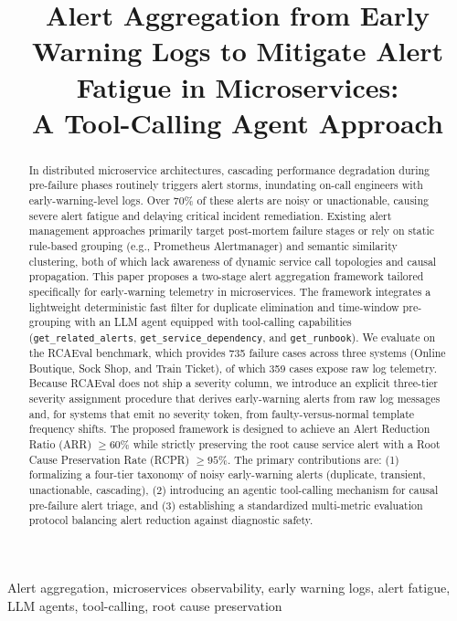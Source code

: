 \documentclass[conference]{IEEEtran}
\title{Alert Aggregation from Early Warning Logs to Mitigate Alert Fatigue in Microservices:\\A Tool-Calling Agent Approach}
\author{
\IEEEauthorblockN{Dang Quang Hien}
\IEEEauthorblockA{
Faculty of Information Technology\\
University of Science, VNU-HCM\\
Ho Chi Minh City, Vietnam\\
dqhien@fit.hcmus.edu.vn
}
}
\begin{document}
\maketitle

\begin{abstract}
In distributed microservice architectures, cascading performance degradation during pre-failure phases routinely triggers alert storms, inundating on-call engineers with early-warning-level logs. Over 70\% of these alerts are noisy or unactionable, causing severe alert fatigue and delaying critical incident remediation. Existing alert management approaches primarily target post-mortem failure stages or rely on static rule-based grouping (e.g., Prometheus Alertmanager) and semantic similarity clustering, both of which lack awareness of dynamic service call topologies and causal propagation. This paper proposes a two-stage alert aggregation framework tailored specifically for early-warning telemetry in microservices. The framework integrates a lightweight deterministic fast filter for duplicate elimination and time-window pre-grouping with an LLM agent equipped with tool-calling capabilities (\texttt{get\_related\_alerts}, \texttt{get\_service\_dependency}, and \texttt{get\_runbook}). We evaluate on the RCAEval benchmark, which provides 735 failure cases across three systems (Online Boutique, Sock Shop, and Train Ticket), of which 359 cases expose raw log telemetry. Because RCAEval does not ship a severity column, we introduce an explicit three-tier severity assignment procedure that derives early-warning alerts from raw log messages and, for systems that emit no severity token, from faulty-versus-normal template frequency shifts. The proposed framework is designed to achieve an Alert Reduction Ratio (ARR) $\ge 60\%$ while strictly preserving the root cause service alert with a Root Cause Preservation Rate (RCPR) $\ge 95\%$. The primary contributions are: (1) formalizing a four-tier taxonomy of noisy early-warning alerts (duplicate, transient, unactionable, cascading), (2) introducing an agentic tool-calling mechanism for causal pre-failure alert triage, and (3) establishing a standardized multi-metric evaluation protocol balancing alert reduction against diagnostic safety.
\end{abstract}

\begin{IEEEkeywords}
Alert aggregation, microservices observability, early warning logs, alert fatigue, LLM agents, tool-calling, root cause preservation
\end{IEEEkeywords}
\end{document}
